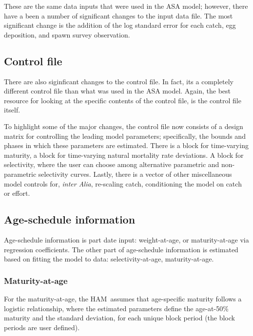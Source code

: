\documentclass[12pt,letterpaper]{article}
\newcommand{\ham}{HAM}
\begin{document}
    These are the same data inputs that were used in the ASA model; however, there have a been a number of significant changes to the input data file.  The most significant change is the addition of the log standard error for each catch, egg deposition, and spawn survey observation.  

  \subsection{Control file} %
  \label{sub:control_file}
    There are also siginficant changes to the control file.  In fact, its a completely different control file than what was used in the ASA model.  Again, the best resource for looking at the specific contents of the control file, is the control file itself. 


    To highlight some of the major changes, the control file now consists of a design matrix for controlling the leading model parameters; specifically, the bounds and phases in which these parameters are estimated.  There is a block for time-varying maturity, a block for time-varying natural mortality rate deviations.  A block for selectivity, where the user can choose among alternative parametric and non-parametric selectivity curves. Lastly, there is a vector of other miscellaneous model controls for, \textit{inter Alia}, re-scaling catch, conditioning the model on catch or effort.  


  \subsection{Age-schedule information} %
  \label{sub:age_schedule_information}
    Age-schedule information is part date input: weight-at-age, or maturity-at-age via regression coefficients. The other part of age-schedule information is estimated based on fitting the model to data: selectivity-at-age, maturity-at-age.  

    \subsubsection{Maturity-at-age} %
    \label{ssub:maturity_at_age}
      For the maturity-at-age, the \ham\ assumes that age-specific maturity follows a logistic relationship, where the estimated parameters define the age-at-50\% maturity and the standard deviation, for each unique block period (the block periods are user defined). 
\end{document}
